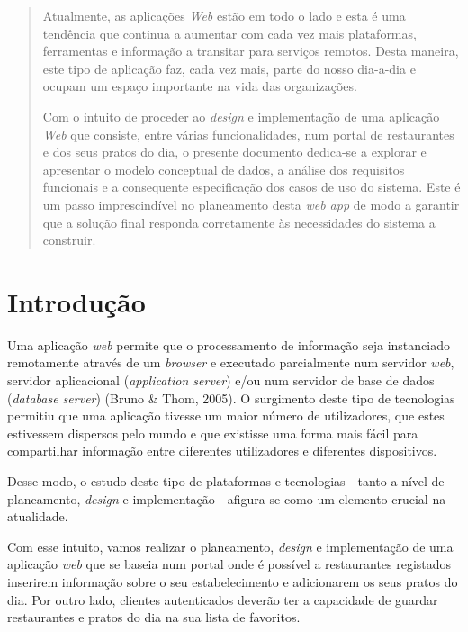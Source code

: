 \documentclass[a4paper,12pt]{report}
\begin{document}
	\begin{abstract}
	Atualmente, as aplicações \textit{Web} estão em todo o lado e esta é uma tendência que continua a aumentar com cada vez mais plataformas, ferramentas e informação a transitar para serviços remotos. Desta maneira, este tipo de aplicação faz, cada vez mais, parte do nosso dia-a-dia e ocupam um espaço importante na vida das organizações.
	
	Com o intuito de proceder ao \textit{design} e implementação de uma aplicação \textit{Web} que consiste, entre várias funcionalidades, num portal de restaurantes e dos seus pratos do dia, o presente documento dedica-se a explorar e apresentar o modelo conceptual de dados, a análise dos requisitos funcionais e a consequente especificação dos casos de uso do sistema. Este é um passo imprescindível no planeamento desta \textit{web app} de modo a garantir que a solução final responda corretamente às necessidades do sistema a construir.
	
	\end{abstract}	
	
	
	\newpage
	\tableofcontents
	
	\newpage	
	
\chapter{Introdução}	

	Uma aplicação \textit{web} permite que o processamento de informação seja instanciado remotamente através de um \textit{browser} e executado parcialmente num servidor \textit{web}, servidor aplicacional (\textit{application server}) e/ou num servidor de base de dados (\textit{database server}) (Bruno \& Thom, 2005). O surgimento deste tipo de tecnologias permitiu que uma aplicação tivesse um maior número de utilizadores, que estes estivessem dispersos pelo mundo e que existisse uma forma mais fácil para compartilhar informação entre diferentes utilizadores e diferentes dispositivos.
	
	Desse modo, o estudo deste tipo de plataformas e tecnologias - tanto a nível de planeamento, \textit{design} e implementação - afigura-se como um elemento crucial na atualidade.
	
	Com esse intuito, vamos realizar o planeamento, \textit{design} e implementação de uma aplicação \textit{web} que se baseia num portal onde é possível a restaurantes registados inserirem informação sobre o seu estabelecimento e adicionarem os seus pratos do dia. Por outro lado, clientes autenticados deverão ter a capacidade de guardar restaurantes e pratos do dia na sua lista de favoritos.  
	
\end{document}
